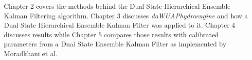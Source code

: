 	Chapter 2 covers the methods behind the Dual State Hierarchical Ensemble Kalman Filtering algorithm. Chapter 3 discusses \textit{daWUAPhydroengine} and how a Dual State Hierarchical Ensemble Kalman Filter was applied to it. Chapter 4 discusses results while Chapter 5 compares those results with calibrated parameters from a Dual State Ensemble Kalman Filter as implemented by Moradkhani et al.
	
	
	

	